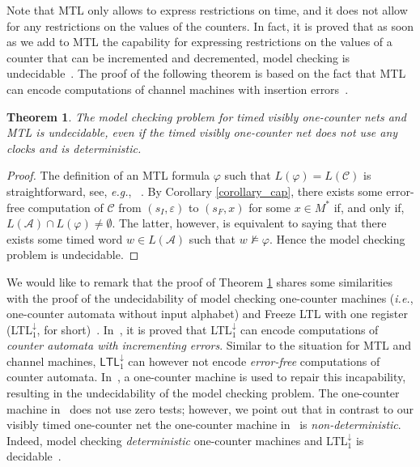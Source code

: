 \documentclass{CSML}
\theoremstyle{plain}\newtheorem{theorem}[thm]{Theorem}
\theoremstyle{plain}\newtheorem{corollary}[thm]{Corollary}
\theoremstyle{plain}\newtheorem{example}[thm]{Example}
\theoremstyle{plain}\newtheorem{lemma}[thm]{Lemma}
\theoremstyle{plain}\newtheorem{remark}[thm]{Remark}
\def\eg{{\em e.g.}}
\newcommand{\mtl}{MTL }
\newcommand*\ie{\textit{i.e.}}
\newcommand{\A}{\mathcal{A}}
\newcommand{\cm}{\mathcal{C}}
\begin{document}
Note that \mtl only allows to express restrictions on time, and it does not allow for any restrictions on the values of the counters. 
In fact, it is proved that as soon as we add to \mtl the capability for expressing restrictions on the values of a counter that can be incremented and decremented, model checking is undecidable~\cite{DBLP:conf/lata/Quaas13}.
The proof of the following theorem is based on the fact that MTL can encode computations of channel machines with insertion errors~\cite{DBLP:conf/lics/OuaknineW05}.
\begin{theorem}
	\label{theorem_model_checking}
	The model checking problem for timed visibly one-counter nets and \mtl is undecidable, even if the timed visibly one-counter net does not use any clocks and is deterministic. 
\end{theorem}
\begin{proof}
	The definition of an \mtl formula $\varphi$ such that $L(\varphi)=L(\cm)$ is straightforward, see, \eg, ~\cite{DBLP:conf/lics/OuaknineW05}.
	By Corollary \ref{corollary_cap}, 
	there exists some error-free computation of $\cm$ from $(s_I,\varepsilon)$ to $(s_F,x)$ for some $x\in M^*$ if, and only if, $L(\A)\cap L(\varphi)\neq\emptyset$. 
	The latter, however, is equivalent to saying that there exists some timed word $w\in L(\A)$ such that $w\not\models\varphi$. 
	Hence the model checking problem is undecidable. 
\end{proof}

We would like to remark that the proof of Theorem \ref{theorem_model_checking} shares some similarities with the proof of the undecidability of model checking one-counter machines (\ie, one-counter automata without input alphabet) and Freeze LTL with one register (LTL$^\downarrow_1$, for short)~\cite{DLS-tcs10}. 
In~\cite{DBLP:journals/tocl/DemriL09},
it is proved that 
LTL$^\downarrow_1$ can encode computations of \emph{counter automata with incrementing errors}. 
Similar to the situation for \mtl and channel machines, $\mathsf{LTL}^\downarrow_1$ can however not encode \emph{error-free} computations of counter automata. 
In~\cite{DLS-tcs10}, a one-counter machine is used to repair this incapability, resulting in the undecidability of the model checking problem. 
The one-counter machine in~\cite{DLS-tcs10} does not use zero tests; however, we point out that in contrast to our visibly timed one-counter net the one-counter machine in~\cite{DLS-tcs10} is \emph{non-deterministic}. Indeed, model checking \emph{deterministic} one-counter machines and LTL$^\downarrow_1$ is decidable~\cite{DLS-tcs10}.
\end{document}
